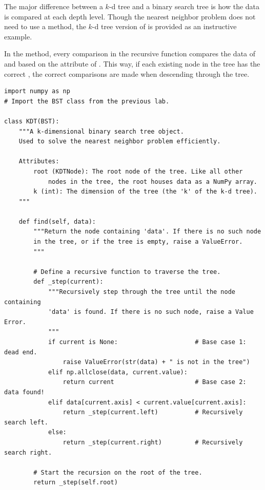 

The major difference between a $k$-d tree and a binary search tree is how the data is compared at each depth level.
Though the nearest neighbor problem does not need to use a  method, the $k$-d tree version of  is provided as an instructive example.

In the  method, every comparison in the recursive  function compares the data of  and  based on the  attribute of .
This way, if each existing node in the tree has the correct , the correct comparisons are made when descending through the tree.

\clearpage

\begin{lstlisting}
import numpy as np
# Import the BST class from the previous lab.

class KDT(BST):
    """A k-dimensional binary search tree object.
    Used to solve the nearest neighbor problem efficiently.

    Attributes:
        root (KDTNode): The root node of the tree. Like all other
            nodes in the tree, the root houses data as a NumPy array.
        k (int): The dimension of the tree (the 'k' of the k-d tree).
    """

    def find(self, data):
        """Return the node containing 'data'. If there is no such node
        in the tree, or if the tree is empty, raise a ValueError.
        """

        # Define a recursive function to traverse the tree.
        def _step(current):
            """Recursively step through the tree until the node containing
            'data' is found. If there is no such node, raise a Value Error.
            """
            if current is None:                     # Base case 1: dead end.
                raise ValueError(str(data) + " is not in the tree")
            elif np.allclose(data, current.value):
                return current                      # Base case 2: data found!
            elif data[current.axis] < current.value[current.axis]:
                return _step(current.left)          # Recursively search left.
            else:
                return _step(current.right)         # Recursively search right.

        # Start the recursion on the root of the tree.
        return _step(self.root)
\end{lstlisting}

